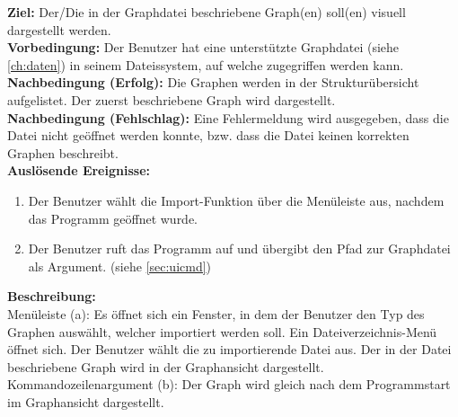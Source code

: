 \label{fa:import}
\textbf{Ziel:} Der/Die in der Graphdatei beschriebene Graph(en) soll(en) visuell dargestellt werden.\\
\textbf{Vorbedingung:} Der Benutzer hat eine unterstützte Graphdatei (siehe \ref{ch:daten}) in seinem Dateissystem, auf welche zugegriffen werden kann.\\
\textbf{Nachbedingung (Erfolg):} Die Graphen werden in der Strukturübersicht aufgelistet. Der zuerst beschriebene Graph wird dargestellt.\\
\textbf{Nachbedingung (Fehlschlag):}
Eine Fehlermeldung wird ausgegeben, dass die Datei nicht geöffnet werden konnte, bzw. dass die Datei keinen korrekten Graphen beschreibt.\\
\textbf{Auslösende Ereignisse:}
\begin{enumerate}[nolistsep, label=(\alph*)]
  \item Der Benutzer wählt die Import-Funktion über die Menüleiste aus, nachdem das Programm geöffnet wurde. %
  \item Der Benutzer ruft das Programm auf und übergibt den Pfad zur Graphdatei als Argument. (siehe \ref{sec:uicmd})
\end{enumerate}
\textbf{Beschreibung:}\\
Menüleiste (a):
Es öffnet sich ein Fenster, in dem der Benutzer den Typ des Graphen auswählt, welcher importiert werden soll. %
Ein Dateiverzeichnis-Menü öffnet sich. %
Der Benutzer wählt die zu importierende Datei aus.
Der in der Datei beschriebene Graph wird in der Graphansicht dargestellt.\\%
Kommandozeilenargument (b): Der Graph wird gleich nach dem Programmstart im Graphansicht dargestellt. \\


